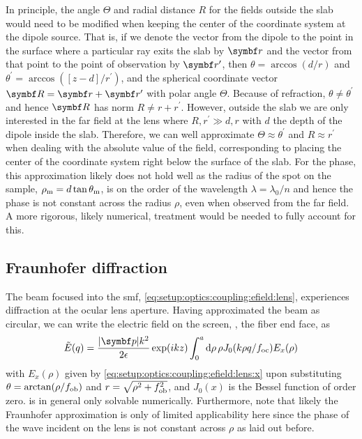 In principle, the angle $\Theta$ and radial distance $R$ for the fields outside the slab would need to be modified when keeping the center of the coordinate system at the dipole source.
That is, if we denote the vector from the dipole to the point in the surface where a particular ray exits the slab by $\bvec{r}$ and the vector from that point to the point of observation by $\bvec{r}^{\prime}$, then $\theta = \arccos(d/r)$ and $\theta^{\prime} = \arccos([z-d]/r^{\prime})$, and the spherical coordinate vector $\bvec{R} = \bvec{r} + \bvec{r}^{\prime}$ with polar angle $\Theta$.
Because of refraction, $\theta\neq\theta^{\prime}$ and hence $\bvec{R}$ has norm $R\neq r + r^{\prime}$.
However, outside the slab we are only interested in the far field at the lens where $R,r^{\prime}\gg d,r$ with $d$ the depth of the dipole inside the slab.
Therefore, we can well approximate $\Theta\approx\theta^{\prime}$ and $R\approx r^{\prime}$ when dealing with the absolute value of the field, corresponding to placing the center of the coordinate system right below the surface of the slab.
For the phase, this approximation likely does not hold well as the radius of the spot on the sample, $\rho_{\mathrm{m}} = d\tan\theta_{\mathrm{m}}$, is on the order of the wavelength $\lambda = \lambda_0/n$ and hence the phase is not constant across the radius $\rho$, even when observed from the far field.
A more rigorous, likely numerical, treatment would be needed to fully account for this.

\subsection{Fraunhofer diffraction}\label{subsec:app:setup:optics:diffraction}
The beam focused into the \gls{smf}, \cref{eq:setup:optics:coupling:efield:lens}, experiences diffraction at the ocular lens aperture.
Having approximated the beam as circular, we can write the electric field on the screen, \ie, the fiber end face, as~\cite{Hecht2017}
\begin{equation}\label{eq:app:setup:optics:diffraction}
    \tilde{E}(q) = \frac{\abs{\bvec{p}}k^2}{2\epsilon}\exp(\i k z)\int_0^a\dd{\rho}\rho J_0(k\rho q/\foc) E_x(\rho)
\end{equation}
with $E_x(\rho)$ given by \cref{eq:setup:optics:coupling:efield:lens:x} upon substituting $\theta = \arctan(\rho/f_{\mathrm{ob}})$ and $r=\sqrt{\rho^2 + f_{\mathrm{ob}}^2}$, and $J_0(x)$ is the Bessel function of order zero.
 is in general only solvable numerically.
Furthermore, note that likely the Fraunhofer approximation is only of limited applicability here since the phase of the wave incident on the lens is not constant across $\rho$ as laid out before.

